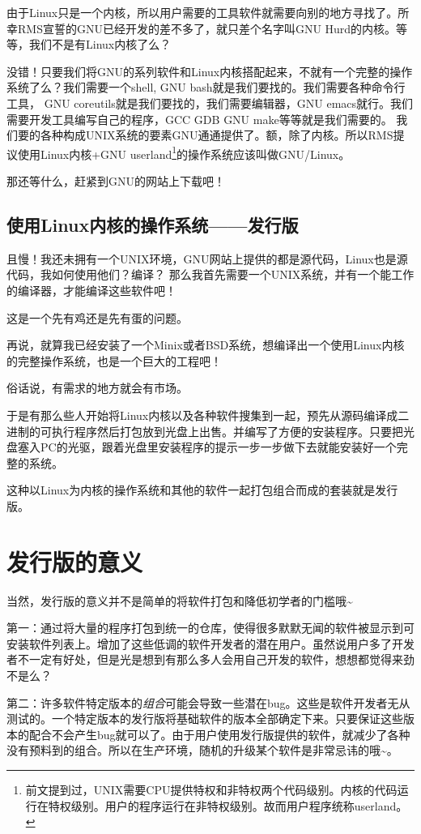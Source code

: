 \documentclass[amstex,twoside]{ctexbook}
\begin{document}
由于Linux只是一个内核，所以用户需要的工具软件就需要向别的地方寻找了。所幸RMS宣誓的GNU已经开发的差不多了，就只差个名字叫GNU Hurd的内核。等等，我们不是有Linux内核了么？

没错！只要我们将GNU的系列软件和Linux内核搭配起来，不就有一个完整的操作系统了么？我们需要一个shell, GNU bash就是我们要找的。我们需要各种命令行工具， GNU coreutils就是我们要找的，我们需要编辑器，GNU emacs就行。我们需要开发工具编写自己的程序，GCC GDB GNU make等等就是我们需要的。 我们要的各种构成UNIX系统的要素GNU通通提供了。额，除了内核。所以RMS提议使用Linux内核+GNU userland\footnote{
前文提到过，UNIX需要CPU提供特权和非特权两个代码级别。内核的代码运行在特权级别。用户的程序运行在非特权级别。故而用户程序统称userland。}的操作系统应该叫做GNU/Linux。

那还等什么，赶紧到GNU的网站上下载吧！

\subsection{使用Linux内核的操作系统——发行版}
且慢！我还未拥有一个UNIX环境，GNU网站上提供的都是源代码，Linux也是源代码，我如何使用他们？编译？
那么我首先需要一个UNIX系统，并有一个能工作的编译器，才能编译这些软件吧！

这是一个先有鸡还是先有蛋的问题。

再说，就算我已经安装了一个Minix或者BSD系统，想编译出一个使用Linux内核的完整操作系统，也是一个巨大的工程吧！

俗话说，有需求的地方就会有市场。

于是有那么些人开始将Linux内核以及各种软件搜集到一起，预先从源码编译成二进制的可执行程序然后打包放到光盘上出售。并编写了方便的安装程序。只要把光盘塞入PC的光驱，跟着光盘里安装程序的提示一步一步做下去就能安装好一个完整的系统。

这种以Linux为内核的操作系统和其他的软件一起打包组合而成的套装就是发行版。


\section{发行版的意义}
当然，发行版的意义并不是简单的将软件打包和降低初学者的门槛哦\textasciitilde

第一：通过将大量的程序打包到统一的仓库，使得很多默默无闻的软件被显示到可安装软件列表上。增加了这些低调的软件开发者的潜在用户。虽然说用户多了开发者不一定有好处，但是光是想到有那么多人会用自己开发的软件，想想都觉得来劲不是么？

第二：许多软件特定版本的\emph{组合}可能会导致一些潜在bug。这些是软件开发者无从测试的。一个特定版本的发行版将基础软件的版本全部确定下来。只要保证这些版本的配合不会产生bug就可以了。由于用户使用发行版提供的软件，就减少了各种没有预料到的组合。所以在生产环境，随机的升级某个软件是非常忌讳的哦\textasciitilde。
\end{document}
